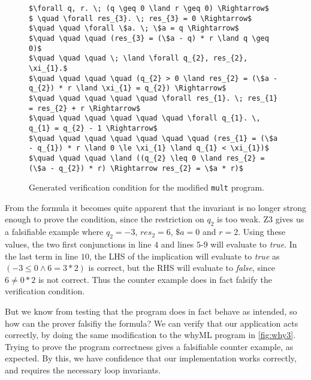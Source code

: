 \begin{figure}
\begin{lstlisting}[mathescape=true]
$\forall q, r. \; (q \geq 0 \land r \geq 0) \Rightarrow$
$ \quad \forall res_{3}. \; res_{3} = 0 \Rightarrow$
$\quad \quad \forall \$a. \; \$a = q \Rightarrow$
$\quad \quad \quad (res_{3} = (\$a - q) * r \land q \geq 0)$
$\quad \quad \quad \; \land \forall q_{2}, res_{2}, \xi_{1}.$
$\quad \quad \quad \quad (q_{2} > 0 \land res_{2} = (\$a - q_{2}) * r \land \xi_{1} = q_{2}) \Rightarrow$
$\quad \quad \quad \quad \quad \forall res_{1}. \; res_{1} = res_{2} + r \Rightarrow$
$\quad \quad \quad \quad \quad \quad \forall q_{1}. \, q_{1} = q_{2} - 1 \Rightarrow$
$\quad \quad \quad \quad \quad \quad \quad (res_{1} = (\$a - q_{1}) * r \land 0 \le \xi_{1} \land q_{1} < \xi_{1})$
$\quad \quad \quad \land ((q_{2} \leq 0 \land res_{2} = (\$a - q_{2}) * r) \Rightarrow res_{2} = \$a * r)$
\end{lstlisting}
\caption{Generated verification condition for the modified \texttt{mult} program.}
\label{fig:modmult}
\end{figure}

From the formula it becomes quite apparent that the invariant is no longer strong enough to prove the condition, since the restriction on $q_{2}$ is too weak. 
Z3 gives us a falsifiable example where $q_2 = -3$, $res_2 = 6$, $\$a = 0$ and $r=2$.
Using these values, the two first conjunctions in line $4$ and lines $5$-$9$ will evaluate to \textit{true}.
In the last term in line $10$, the LHS of the implication will evaluate to \textit{true} as
$(-3 \leq 0 \land 6 = 3 * 2)$
is correct, but the RHS will evaluate to \textit{false}, since
$6 \neq 0 * 2$
is not correct. Thus the counter example does in fact falsify the verification condition.

But we know from testing that the program does in fact behave as intended, so how can the prover falsifiy the formula? 
We can verify that our application acts correctly, by doing the same modification to the whyML program in \cref{fig:why3}.
Trying to prove the program correctness gives a falsifiable counter example, as expected.
By this, we have confidence that our implementation works correctly, and requires the necessary loop invariants.

